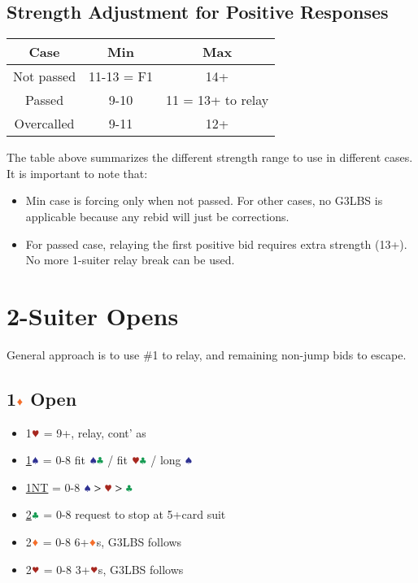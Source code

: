 \documentclass{article}
\begin{document}
\begin{multicols}{2}
\subsection{Strength Adjustment for Positive Responses}
\begin{tabular}{c|c|c}
    \hline
    Case & Min & Max \\ \hline
    Not passed & 11-13 = F1 & 14+ \\ \hline
    Passed & 9-10 & 11 = 13+ to relay \\ \hline
    Overcalled & 9-11 & 12+ \\ \hline
\end{tabular}

\noindent The table above summarizes the different strength range to use in different cases. It is important to note that:
\begin{itemize}
    \item Min case is forcing only when not passed. For other cases, no G3LBS is applicable because any rebid will just be corrections.
    \item For passed case, relaying the first positive bid requires extra strength (13+). No more 1-suiter relay break can be used.
\end{itemize}

\section{2-Suiter Opens}
General approach is to use \#1 to relay, and remaining non-jump bids to escape.

\subsection{1$\ddd$ Open}\label{sec:1d}
\begin{itemize}
    \item 1$\hhh$ = 9+, relay, cont' as 
    \item \hyperref[sec:1d-escape]{1$\sss$} = 0-8 fit $\sss\ccc$ / fit $\hhh\ccc$ / long $\sss$
    \item \hyperref[sec:1d-escape]{1NT} = 0-8 $\sss>\hhh>\ccc$
    \item \hyperref[sec:1d-escape]{2$\ccc$} = 0-8 request to stop at 5+card suit
    \item 2$\ddd$ = 0-8 6+$\ddd$s, G3LBS follows
    \item 2$\hhh$ = 0-8 3+$\hhh$s, G3LBS follows
\end{itemize}


\end{multicols}
\end{document}
